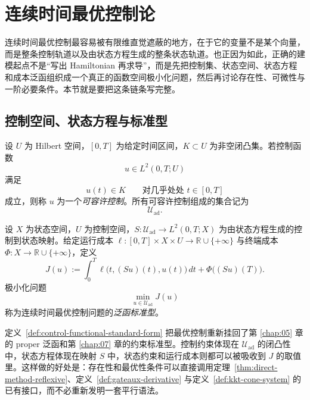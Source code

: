 \section{连续时间最优控制论}

\label{sec:11-1}

连续时间最优控制最容易被有限维直觉遮蔽的地方，在于它的变量不是某个向量，而是整条控制轨道以及由状态方程生成的整条状态轨道。也正因为如此，正确的建模起点不是“写出 Hamiltonian 再求导”，而是先把控制集、状态空间、状态方程和成本泛函组织成一个真正的函数空间极小化问题，然后再讨论存在性、可微性与一阶必要条件。本节就是要把这条链条写完整。

\subsection{控制空间、状态方程与标准型}

\begin{definition}[可容许控制]\label{def:admissible-control}
设 $U$ 为 Hilbert 空间，$[0,T]$ 为给定时间区间，$K\subset U$ 为非空闭凸集。若控制函数
\[
u\in L^2(0,T;U)
\]
满足
\[
u(t)\in K \qquad \text{对几乎处处 } t\in[0,T]
\]
成立，则称 $u$ 为一个\emph{可容许控制}。所有可容许控制组成的集合记为
\[
\mathcal U_{\mathrm{ad}}.
\]
\end{definition}

\begin{definition}[控制问题的泛函标准型]\label{def:control-functional-standard-form}
设 $X$ 为状态空间，$U$ 为控制空间，$S\colon \mathcal U_{\mathrm{ad}}\to L^2(0,T;X)$ 为由状态方程生成的控制到状态映射。给定运行成本 $\ell\colon [0,T]\times X\times U\to \mathbb R\cup\{+\infty\}$ 与终端成本 $\Phi\colon X\to \mathbb R\cup\{+\infty\}$，定义
\[
J(u):=\int_0^T \ell\bigl(t,(Su)(t),u(t)\bigr)\,dt+\Phi\bigl((Su)(T)\bigr).
\]
极小化问题
\[
\min_{u\in \mathcal U_{\mathrm{ad}}} J(u)
\]
称为连续时间最优控制问题的\emph{泛函标准型}。
\end{definition}

\begin{remark}
定义~\ref{def:control-functional-standard-form} 把最优控制重新挂回了第 \ref{chap:05} 章的 proper 泛函和第 \ref{chap:07} 章的约束标准型。控制约束体现在 $\mathcal U_{\mathrm{ad}}$ 的闭凸性中，状态方程体现在映射 $S$ 中，状态约束和运行成本则都可以被吸收到 $J$ 的取值里。这样做的好处是：存在性和最优性条件可以直接调用定理~\ref{thm:direct-method-reflexive}、定义~\ref{def:gateaux-derivative} 与定义~\ref{def:kkt-cone-system} 的已有接口，而不必重新发明一套平行语法。
\end{remark}


